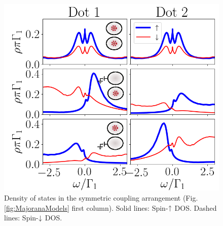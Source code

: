 \documentclass[showpacs,aps,prb,reprint,superscriptaddress]{revtex4-1}
\begin{document}
 



\begin{figure}[bt]
\begin{center}
\includegraphics[scale=0.45]{Graficos/Nt1=t2.png}
\caption{ \label{fig:SymCoupling}  Density of states in the symmetric coupling arrangement (Fig.\ref{fig:MajoranaModels} first column). Solid lines: Spin-$\uparrow$ DOS. Dashed lines: Spin-$\downarrow$ DOS.  
}
%
\label{fig:GenModel}
\end{center}
\end{figure}
\end{document}
